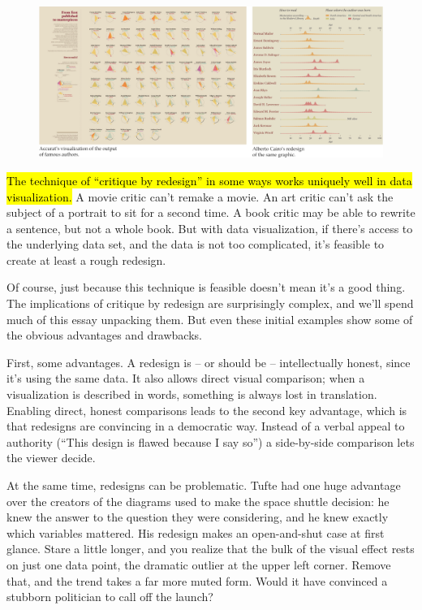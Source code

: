 \documentclass[sigconf,nonacm,screen,pbalance]{acmart}
\begin{document}
\begin{figure}[ht]
\centering
\includegraphics[width=\textwidth]{1_1w9irsLhPVwMdUrLPJXs-A.png}
\end{figure}


\hl{The technique of ``critique by
redesign'' in some ways works uniquely well in data visualization.} A movie critic
can't remake a movie. An art critic can't ask the subject of a portrait to sit for a
second time. A book critic may be able to rewrite a sentence, but not a whole book. But
with data visualization, if there's access to the underlying data set, and the data is not
too complicated, it's feasible to create at least a rough redesign.

Of course, just because this technique is feasible doesn't
mean it's a good thing. The implications of critique by redesign are surprisingly complex,
and we'll spend much of this essay unpacking them. But even these initial examples show
some of the obvious advantages and drawbacks.

First, some advantages. A redesign is -- or should be --
intellectually honest, since it's using the same data. It also allows direct visual
comparison; when a visualization is described in words, something is always lost in
translation. Enabling direct, honest comparisons leads to the second key advantage, which
is that redesigns are convincing in a democratic way. Instead of a verbal appeal to
authority (``This design is flawed because I say so'') a side-by-side comparison lets the
viewer decide.

At the same time, redesigns can be problematic. Tufte had one
huge advantage over the creators of the diagrams used to make the space shuttle decision:
he knew the answer to the question they were considering, and he knew exactly which
variables mattered. His redesign makes an open-and-shut case at first glance. Stare a
little longer, and you realize that the bulk of the visual effect rests on just one data
point, the dramatic outlier at the upper left corner. Remove that, and the trend takes a
far more muted form. Would it have convinced a stubborn politician to call off the launch?
\end{document}
